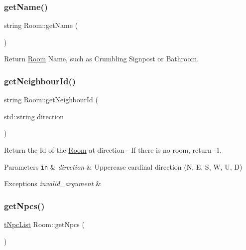 \mbox{\label{class_room_a5701522ecf180c978eaa454d79f3e305}} 
\subsubsection{\texorpdfstring{get\+Name()}{getName()}}
{\footnotesize\ttfamily string Room\+::get\+Name (\begin{DoxyParamCaption}{ }\end{DoxyParamCaption})}



Return \mbox{\hyperlink{class_room}{Room}} Name, such as Crumbling Signpost or Bathroom. 

\mbox{\label{class_room_a9418b46d33d52d5eecba639ca59e66f0}} 
\subsubsection{\texorpdfstring{get\+Neighbour\+Id()}{getNeighbourId()}}
{\footnotesize\ttfamily string Room\+::get\+Neighbour\+Id (\begin{DoxyParamCaption}\item[{std\+::string}]{direction }\end{DoxyParamCaption})\hspace{0.3cm}{\ttfamily [protected]}}



Return the Id of the \mbox{\hyperlink{class_room}{Room}} at direction -\/ If there is no room, return -\/1. 


\begin{DoxyParams}[1]{Parameters}
\mbox{\tt in}  & {\em direction} & Uppercase cardinal direction (N, E, S, W, U, D) \\
\hline
\end{DoxyParams}

\begin{DoxyExceptions}{Exceptions}
{\em invalid\+\_\+argument} & \\
\hline
\end{DoxyExceptions}
\mbox{\label{class_room_a69f8d248898224ab463b686e37608155}} 
\subsubsection{\texorpdfstring{get\+Npcs()}{getNpcs()}}
{\footnotesize\ttfamily \mbox{\hyperlink{_room_8h_af9e617d8fa018c922a1e9748f7e046f9}{t\+Npc\+List}} Room\+::get\+Npcs (\begin{DoxyParamCaption}{ }\end{DoxyParamCaption})}



